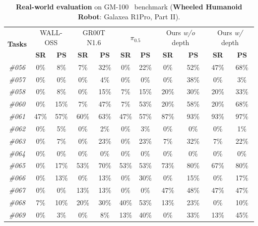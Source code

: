 \begin{table}[t]
  \centering
  \caption{\textbf{Real-world evaluation} on GM-100~\cite{gm100} benchmark (\textbf{Wheeled Humanoid Robot}: Galaxea R1Pro, Part II).}
  \small
  \setlength{\tabcolsep}{12pt}
    \begin{tabular}{ccccccccccc}
    \toprule
    \multirow{2}[2]{*}{\textbf{Tasks}} & \multicolumn{2}{c}{WALL-OSS} & \multicolumn{2}{c}{GR00T N1.6} & \multicolumn{2}{c}{$\pi_{0.5}$} & \multicolumn{2}{c}{Ours \textit{w/o} depth} & \multicolumn{2}{c}{Ours \textit{w/} depth} \\
          & \textbf{SR} & \textbf{PS} & \textbf{SR} & \textbf{PS} & \textbf{SR} & \textbf{PS} & \textbf{SR} & \textbf{PS} & \textbf{SR} & \textbf{PS} \\
    \midrule
\textit{\#056} & 0\%   & 8\%   & 7\%   & 32\%  & 0\%   & 22\%  & 0\%   & 52\%  & 47\%  & 68\% \\
    \textit{\#057} & 0\%   & 0\%   & 0\%   & 4\%   & 0\%   & 0\%   & 0\%   & 38\%  & 0\%   & 3\% \\
    \textit{\#058} & 0\%   & 8\%   & 0\%   & 15\%  & 7\%   & 15\%  & 20\%  & 30\%  & 20\%  & 33\% \\
    \textit{\#060} & 0\%   & 15\%  & 7\%   & 47\%  & 7\%   & 53\%  & 20\%  & 58\%  & 20\%  & 68\% \\
    \textit{\#061} & 47\%  & 57\%  & 60\%  & 63\%  & 47\%  & 57\%  & 87\%  & 93\%  & 93\%  & 97\% \\
    \textit{\#062} & 0\%   & 5\%   & 0\%   & 2\%   & 0\%   & 3\%   & 0\%   & 0\%   & 0\%   & 1\% \\
    \textit{\#063} & 0\%   & 7\%   & 0\%   & 23\%  & 0\%   & 23\%  & 7\%   & 32\%  & 7\%   & 22\% \\
    \textit{\#064} & 0\%   & 0\%   & 0\%   & 0\%   & 0\%   & 0\%   & 0\%   & 0\%   & 0\%   & 0\% \\
    \textit{\#065} & 0\%   & 17\%  & 53\%  & 70\%  & 53\%  & 53\%  & 73\%  & 80\%  & 67\%  & 80\% \\
    \textit{\#066} & 0\%   & 13\%  & 0\%   & 13\%  & 0\%   & 30\%  & 0\%   & 15\%  & 0\%   & 17\% \\
    \textit{\#067} & 0\%   & 0\%   & 13\%  & 13\%  & 0\%   & 0\%   & 47\%  & 48\%  & 47\%  & 47\% \\
    \textit{\#068} & 7\%   & 10\%  & 20\%  & 30\%  & 40\%  & 53\%  & 13\%  & 23\%  & 0\%   & 10\% \\
    \textit{\#069} & 0\%   & 3\%   & 0\%   & 8\%   & 13\%  & 40\%  & 0\%   & 33\%  & 13\%  & 45\% \\

\end{tabular}
\end{table}
